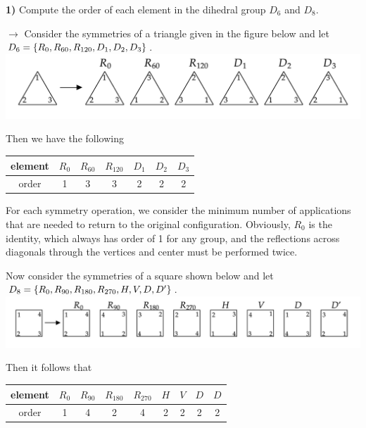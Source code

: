 \documentclass[12pt,a4paper]{article}
\newcommand{\prob}[2]{\textbf{#1)} #2}
\begin{document}
\prob{1}{Compute the order of each element in the dihedral group $D_6$ and $D_8$.}

$\rightarrow$ Consider the symmetries of a triangle given in the figure below and let $D_6 = \{R_{0},R_{60},\\ R_{120},D_1,D_2,D_3\}$. 
\bef
\includegraphics[scale=0.3]{fig1.png}
\eef

Then we have the following
\begin{table}[H]
 \begin{center}
  \begin{tabular}{|c|c|c|c|c|c|c|}
   \hline
   element & $R_{0}$ & $R_{60}$ & $R_{120}$ & $D_1$ & $D_2$ & $D_3$ \\
   \hline
   order & 1 & 3 & 3 & 2 & 2 & 2 \\
   \hline
  \end{tabular}
 \end{center}
\end{table}
For each symmetry operation, we consider the minimum number of applications that are needed to return to the original configuration. Obviously, $R_{0}$ is the identity, which always has order of 1 for any group, and the reflections across diagonals through the vertices and center must be performed twice.

Now consider the symmetries of a square shown below and let $D_8 = \{R_{0},R_{90},R_{180},R_{270},H,\\V,D,D'\}$. 
\bef
\includegraphics[scale=0.3]{fig2.png}
\eef

Then it follows that
\begin{table}[H]
 \begin{center}
  \begin{tabular}{|c|c|c|c|c|c|c|c|c|}
   \hline
   element & $R_{0}$ & $R_{90}$ & $R_{180}$ & $R_{270}$ & $H$ & $V$ & $D$ & $D$ \\
   \hline
   order & 1 & 4 & 2 & 4 & 2 & 2 & 2 & 2 \\
   \hline
  \end{tabular}
 \end{center}
\end{table}
\end{document}
